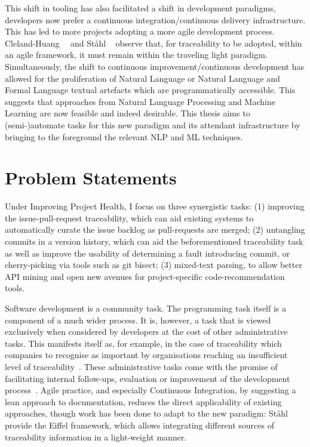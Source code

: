 This shift in tooling has also facilitated a shift in development paradigms,
developers now prefer a continuous integration/continuous delivery
infrastructure. This has led to more projects adopting a more agile development
process. Cleland-Huang~\etal~\cite{Cleland-Huang2014} and St{\aa}hl
\etal~\cite{Stahl2017} observe that, for traceability to be adopted, within an
agile framework, it must remain within the traveling light paradigm.
Simultaneously, the shift to continuous improvement/continuous development has
allowed for the proliferation of Natural Language or Natural Language and Formal
Language textual artefacts which are programmatically accessible. This suggests
that approaches from Natural Language Processing and Machine Learning are now
feasible and indeed desirable. This thesis aims to (semi-)automate tasks for
this new paradigm and its attendant infrastructure by bringing to the foreground
the relevant NLP and ML techniques.

\section{Problem Statements}
\label{chapter:introduction:sec:problem_statement}


Under Improving Project Health, I focus on three synergistic tasks: (1)
improving the issue-pull-request traceability, which can aid existing systems to
automatically curate the issue backlog as pull-requests are merged; (2)
untangling commits in a version history, which can aid the beforementioned
traceability task as well as improve the usability of determining a fault
introducing commit, or cherry-picking via tools such as git bisect; (3)
mixed-text parsing, to allow better API mining and open new avenues for
project-specific code-recommendation tools. 

Software development is a community task. The programming task itself is a
component of a much wider process. It is, however, a task that is viewed
exclusively when considered by developers at the cost of other administrative
tasks. This manifests itself as, for example, in the case of traceability which
companies to recognise as important by organisations reaching an insufficient
level of traceability~\cite{mader2009motivation}. These administrative tasks
come with the promise of facilitating internal follow-ups, evaluation or
improvement of the development process~\cite{domges1998adapting}. Agile
practice, and especially Continuous Integration, by suggesting a lean approach
to documentation, reduces the direct applicability of existing approaches,
though work has been done to adapt to the new paradigm:
Ståhl~\etal~\cite{Stahl2017} provide the Eiffel framework, which allows
integrating different sources of traceability information in a light-weight
manner.

